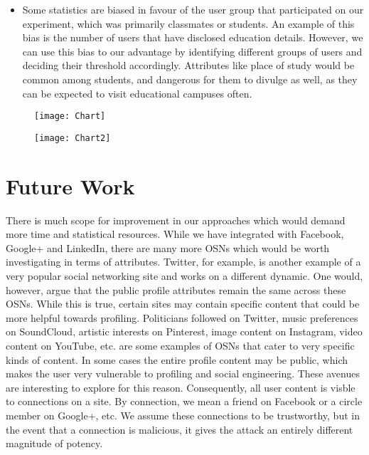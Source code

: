 \documentclass[10pt,conference]{IEEEtran}
\begin{document}
\begin{itemize}
\item Some statistics are biased in favour of the user group that participated on our experiment, which was primarily classmates or students. An example of this bias is the number of users that have disclosed education details. However, we can use this bias to our advantage by identifying different groups of users and deciding their threshold accordingly. Attributes like place of study would be common among students, and dangerous for them to divulge as well, as they can be expected to visit educational campuses often.\\
\end{itemize}

	\begin{figure}[h]
		\centering
		\texttt{[image: Chart]}
	\end{figure}
 
	\begin{figure}[h]
		\centering
		\texttt{[image: Chart2]}
	\end{figure}

\section{Future Work}
There is much scope for improvement in our approaches which would demand more time and statistical resources. While we have integrated with Facebook, Google+ and LinkedIn, there are many more OSNs which would be worth investigating in terms of attributes. Twitter, for example, is another example of a very popular social networking site and works on a different dynamic. One would, however, argue that the public profile attributes remain the same across these OSNs. While this is true, certain sites may contain specific content that could be more helpful towards profiling. Politicians followed on Twitter, music preferences on SoundCloud, artistic interests on Pinterest, image content on Instagram, video content on YouTube, etc. are some examples of OSNs that cater to very specific kinds of content. In some cases the entire profile content may be public, which makes the user very vulnerable to profiling and social engineering. These avenues are interesting to explore for this reason. Consequently, all user content is visble to connections on a site. By connection, we mean a friend on Facebook or a circle member on Google+, etc. We assume these connections to be trustworthy, but in the event that a connection is malicious, it gives the attack an entirely different magnitude of potency.\\
\end{document}

